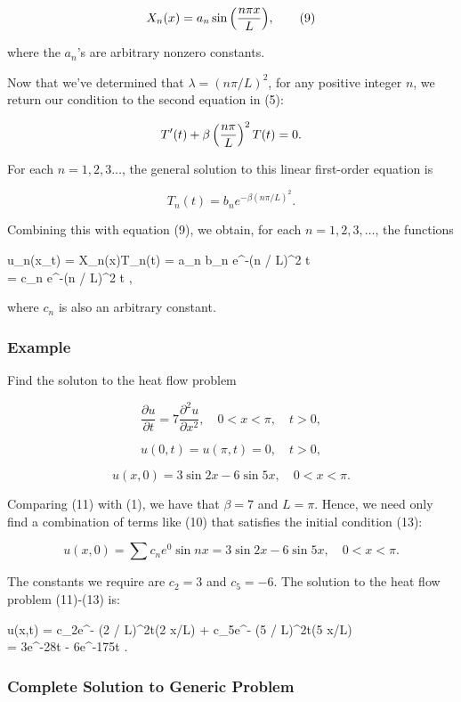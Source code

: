 \documentclass{article}
\begin{document}
\[ X_n(x) = a_n \sin{\left(\frac{n \pi x}{L}\right) }, \tag{9} \]

where the $a_n$'s are arbitrary nonzero constants.

Now that we've determined that $\lambda = (n \pi/L)^2$, for any positive \@{integer} $n$, we return our condition to the second equation in (5):

\[ T'(t) + \beta \left(\frac{n \pi}{L}\right)^2 T(t) = 0. \]

For each $n = 1, 2, 3 \dots$, the general solution to this linear first-order equation is

\[ T_n(t) = b_n e^{-\beta(n \pi/L)^2}. \]

Combining this with equation (9), we obtain, for each $n = 1,2,3,\dots$, the functions

\bal u_n(x_t) = X_n(x)T_n(t) = a_n b_n e^{-\beta (n \pi / L)^2 t} \\ = c_n  e^{-\beta (n \pi / L)^2 t} , \eal

where $c_n$ is also an arbitrary constant.

\subsubsection{Example}

Find the soluton to the heat flow problem

\[ \frac{\partial u}{\partial t} = 7 \frac{\partial^2 u}{\partial x^2}, \quad 0 < x < \pi, \quad t > 0, \tag{11} \]

\[ u(0, t) = u(\pi, t) = 0, \quad t>0, \tag{12} \]

\[ u(x,0) = 3\sin{2x} - 6\sin{5x}, \quad 0 < x < \pi. \tag{13} \]

Comparing (11) with (1), we have that $\beta = 7$ and $L = \pi$. Hence, we need only find a combination of terms like (10) that satisfies the initial condition (13):

\[ u(x,0) = \sum c_n e^0 \sin{nx} =  3\sin{2x} - 6\sin{5x}, \quad 0 < x < \pi. \]

The constants we require are $c_2 = 3$ and $c_5 = -6$. The solution to the heat flow problem (11)-(13) is:

\bal u(x,t) = c_2e^{- \beta(2 \pi / L)^2t}\sin(2 \pi x/L) + c_5e^{- \beta(5 \pi / L)^2t}\sin(5 \pi x/L) \\ = 3e^{-28t} - 6e^{-175t} . \eal

\subsubsection{Complete Solution to Generic Problem}
\end{document}
